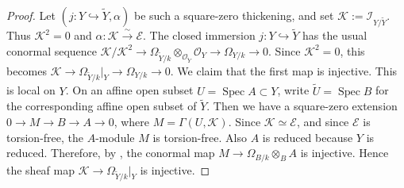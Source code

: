 \documentclass[11pt,twoside]{amsart}
\theoremstyle{plain}
\numberwithin{equation}{section}
\theoremstyle{definition}
\begin{document}
\begin{proof}
Let \((j:Y\hookrightarrow \widetilde Y,\alpha)\) be such a square-zero thickening, and set
\(\mathcal K:=\mathcal I_{Y/\widetilde Y}\). Thus \(\mathcal K^{2}=0\) and
\(\alpha:\mathcal K\xrightarrow{\sim}\mathcal E\). The closed immersion \(j:Y\hookrightarrow \widetilde Y\) has the usual conormal sequence
\(\mathcal K/\mathcal K^{2}\to
\Omega_{\widetilde Y/k}\otimes_{\mathcal O_{\widetilde Y}}\mathcal O_Y\to
\Omega_{Y/k}\to 0\).
Since \(\mathcal K^2=0\), this becomes
\(\mathcal K\to\Omega_{\widetilde Y/k}|_Y\to\Omega_{Y/k}\to 0\).
We claim that the first map is injective. This is local on \(Y\). On an affine open
subset \(U=\operatorname{Spec}A\subset Y\), write \(\widetilde U=\operatorname{Spec}B\)
for the corresponding affine open subset of \(\widetilde Y\). Then we have a
square-zero extension \(0\to M\to B\to A\to 0\), where \(M=\Gamma(U,\mathcal K)\).
Since \(\mathcal K\simeq\mathcal E\), and since \(\mathcal E\) is torsion-free, the
\(A\)-module \(M\) is torsion-free. Also \(A\) is reduced because \(Y\) is reduced.
Therefore, by , the conormal map
\(M\to\Omega_{B/k}\otimes_B A\) is injective. Hence the sheaf map
\(\mathcal K\to\Omega_{\widetilde Y/k}|_Y\) is injective.


\end{proof}
\end{document}
